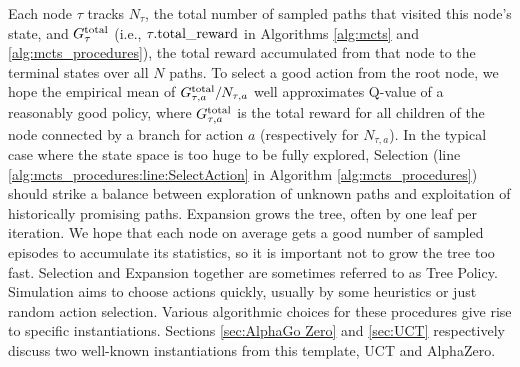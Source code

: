Each node $\tau$ tracks $N_\tau$, the total number of sampled paths that visited this node's state, and $G^{\rm total}_\tau$ (i.e., $\tau.{\rm total\_reward}$ in Algorithms \ref{alg:mcts} and \ref{alg:mcts_procedures}), the total reward accumulated from that node to the terminal states over all $N$ paths. To select a good action from the root node, we hope the empirical mean of $G^{\rm total}_{\tau,a}/N_{\tau,a}$ well approximates Q-value of a reasonably good policy, where $G^{\rm total}_{\tau,a}$ is the total reward for all children of the node connected by a branch for action $a$ (respectively for $N_{\tau,a}$).
In the typical case where the state space is too huge to be fully explored, Selection (line \ref{alg:mcts_procedures:line:SelectAction} in Algorithm \ref{alg:mcts_procedures}) should strike a balance between exploration of unknown paths and exploitation of historically promising paths.
Expansion grows the tree, often by one leaf per iteration. We hope that each node on average gets a good number of sampled episodes to accumulate its statistics, so it is important not to grow the tree too fast.
Selection and Expansion together are sometimes referred to as Tree Policy.
Simulation aims to choose actions quickly, usually by some heuristics or just random action selection.
Various algorithmic choices for these procedures give rise to specific instantiations.
Sections \ref{sec:AlphaGo Zero} and \ref{sec:UCT} respectively discuss two well-known instantiations from this template, UCT and AlphaZero.

